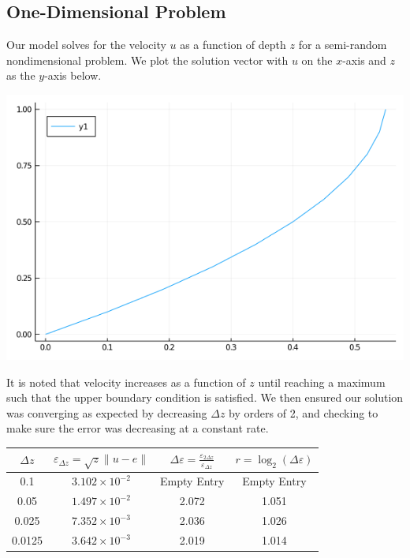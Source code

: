 \documentclass[11pt]{article}
\begin{document}
	\subsection{One-Dimensional Problem}
	Our model solves for the velocity $ u $ as a function of depth $ z $ for a semi-random nondimensional problem. We plot the solution vector with $ u $ on the $ x $-axis and $ z $ as the $ y $-axis below.
	\begin{center}
		\includegraphics[scale=0.5]{1D_mid_res.png}
	\end{center}
	It is noted that velocity increases as a function of $ z $ until reaching a maximum such that the upper boundary condition is satisfied.
	\newline\indent
	We then ensured our solution was converging as expected by decreasing $ \Delta z $ by orders of 2, and checking to make sure the error was decreasing at a constant rate.
	\begin{center}
		\renewcommand{\arraystretch}{2.0}
		\begin{tabular}{c|c|c|c}
			\hline\hline
			$\displaystyle \Delta z $&$\displaystyle \varepsilon_{\Delta z} = \sqrt{z}\lVert u-e\rVert $&$ \displaystyle \Delta\varepsilon = \frac{\varepsilon_{2\Delta z}}{\varepsilon_{\Delta z}} $&$\displaystyle r = \log_2\left(\Delta\varepsilon\right) $\\
			\hline
			0.1&$3.102\times 10^{-2}$&Empty Entry&Empty Entry\\
			0.05&$1.497\times 10^{-2}$&2.072&1.051\\
			0.025&$7.352\times 10^{-3}$&2.036&1.026\\
			0.0125&$3.642\times 10^{-3}$&2.019&1.014\\
			\hline
		\end{tabular}
	\end{center}
\end{document}
